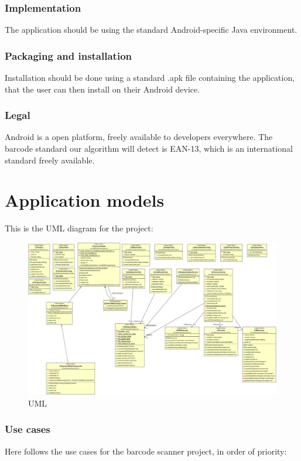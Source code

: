 \documentclass{report}
\begin{document}
\subsection{Implementation}
The application should be using the standard Android-specific Java environment.

\subsection{Packaging and installation}
Installation should be done using a standard .apk file containing the application, that the user can then install on their Android device.

\subsection{Legal}
Android is a open platform, freely available to developers everywhere. The barcode standard our algorithm will detect is EAN-13, which is an international standard freely available.

\pagebreak

\chapter{Application models}
This is the UML diagram for the project:
\begin{figure}[H]
		\centering
		\includegraphics[width=\textwidth]{uml.png}
		\caption{UML}
		\label{fig:UML}
\end{figure}



\subsection{Use cases}
Here follows the use cases for the barcode scanner project, in order of priority: 
\end{document}
